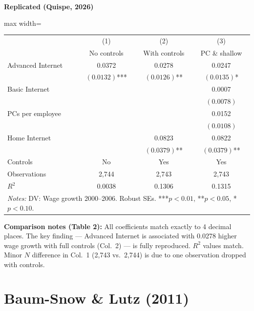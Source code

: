 \documentclass[11pt,a4paper]{article}
\begin{document}
\begin{minipage}[t]{0.48\textwidth}
\centering
\textbf{\large Replicated (Quispe, 2026)}
\vspace{0.3cm}

\begin{adjustbox}{max width=\textwidth}
\begin{tabular}{lccc}
\toprule
 & (1) & (2) & (3) \\
 & No controls & With controls & PC \& shallow \\
\midrule
Advanced Internet & 0.0372 & 0.0278 & 0.0247 \\
 & $(0.0132)$*** & $(0.0126)$** & $(0.0135)$* \\[0.3em]
Basic Internet &  &  & 0.0007 \\
 &  &  & $(0.0078)$ \\[0.3em]
PCs per employee &  &  & 0.0152 \\
 &  &  & $(0.0108)$ \\[0.3em]
Home Internet &  & 0.0823 & 0.0822 \\
 &  & $(0.0379)$** & $(0.0379)$** \\[0.3em]
\midrule
Controls & No & Yes & Yes \\
Observations & 2,744 & 2,743 & 2,743 \\
$R^2$ & 0.0038 & 0.1306 & 0.1315 \\
\bottomrule
\multicolumn{4}{p{0.95\textwidth}}{\footnotesize\textit{Notes:} DV: Wage growth 2000--2006. Robust SEs. ***$p<0.01$, **$p<0.05$, *$p<0.10$.}
\end{tabular}
\end{adjustbox}
\end{minipage}

\vspace{1cm}
\textbf{Comparison notes (Table 2):} All coefficients match exactly to 4 decimal places. The key finding --- Advanced Internet is associated with 0.0278 higher wage growth with full controls (Col.\ 2) --- is fully reproduced. $R^2$ values match. Minor $N$ difference in Col.\ 1 (2,743 vs.\ 2,744) is due to one observation dropped with controls.

\newpage

\section{Baum-Snow \& Lutz (2011)}
\end{document}
